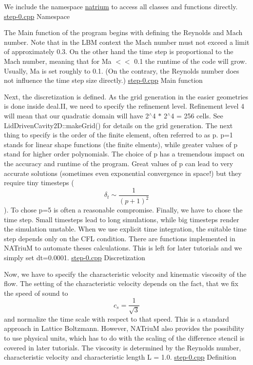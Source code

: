We include the namespace \hyperlink{namespacenatrium}{natrium} to access all classes and functions directly.  \hyperlink{step-0_8cpp}{step-\/0.cpp} Namespace

The Main function of the program begins with defining the Reynolds and Mach number. Note that in the LBM context the Mach number must not exceed a limit of approximately 0.3. On the other hand the time step is proportional to the Mach number, meaning that for Ma $<$$<$ 0.1 the runtime of the code will grow. Usually, Ma is set roughly to 0.1. (On the contrary, the Reynolds number does not influence the time step size directly.)  \hyperlink{step-0_8cpp}{step-\/0.cpp} Main function

Next, the discretization is defined. As the grid generation in the easier geometries is done inside deal.II, we need to specify the refinement level. Refinement level 4 will mean that our quadratic domain will have 2$^\wedge$4 $\ast$ 2$^\wedge$4 = 256 cells. See LidDrivenCavity2D::makeGrid() for details on the grid generation. The next thing to specify is the order of the finite element, often referred to as p. p=1 stands for linear shape functions (the finite elments), while greater values of p stand for higher order polynomials. The choice of p has a tremendous impact on the accuracy and runtime of the program. Great values of p can lead to very accurate solutions (sometimes even exponential convergence in space!) but they require tiny timesteps (\[ \delta_t \sim \frac{1}{(p+1)^2} \]). To chose p=5 is often a reasonable compromise. Finally, we have to chose the time step. Small timesteps lead to long simulations, while big timesteps render the simulation unstable. When we use explicit time integration, the suitable time step depends only on the CFL condition. There are functions implemented in NATriuM to automate theses calculations. This is left for later tutorials and we simply set dt=0.0001.  \hyperlink{step-0_8cpp}{step-\/0.cpp} Discretization

Now, we have to specify the characteristic velocity and kinematic viscosity of the flow. The setting of the characteristic velocity depends on the fact, that we fix the speed of sound to \[ c_s = \frac{1}{\sqrt{3}} \] and normalize the time scale with respect to that speed. This is a standard approach in Lattice Boltzmann. However, NATriuM also provides the possibility to use physical units, which has to do with the scaling of the difference stencil is covered in later tutorials. The viscosity is determined by the Reynolds number, characteristic velocity and characteristic length L = 1.0.  \hyperlink{step-0_8cpp}{step-\/0.cpp} Definition

